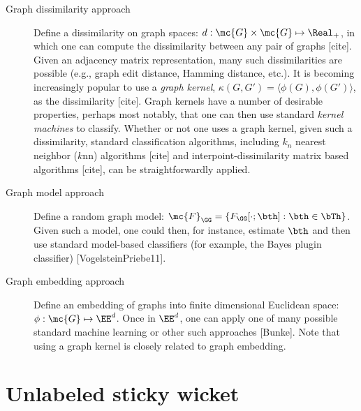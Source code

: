 \begin{description}
	\item[Graph dissimilarity approach] Define a dissimilarity on graph spaces: $d: \mc{G} \times \mc{G} \mapsto \Real_+$, in which one can compute the dissimilarity between any pair of graphs [cite]. Given an adjacency matrix representation, many such dissimilarities are possible (e.g., graph edit distance, Hamming distance, etc.).  It is becoming increasingly popular to use a \emph{graph kernel}, $\kappa(G,G')=\langle \phi(G), \phi(G') \rangle$, as the dissimilarity [cite].  Graph kernels have a number of desirable properties, perhaps most notably, that one can then use standard \emph{kernel machines} to classify.	Whether or not one uses a graph kernel, given such a dissimilarity, standard classification algorithms, including $k_n$ nearest neighbor ($k$nn) algorithms [cite] and interpoint-dissimilarity matrix based algorithms [cite], can be straightforwardly applied.  
	\item[Graph model approach] Define a random graph model: $\mc{F}_{\GG} = \{F_{\GG}[\cdot; \bth] : \bth \in \bTh\}$.  Given such a model, one could then, for instance, estimate $\bth$ and then use standard model-based classifiers (for example, the Bayes plugin classifier) [VogelsteinPriebe11]. 
	\item[Graph embedding approach] Define an embedding of graphs into finite dimensional Euclidean space: $\phi: \mc{G} \mapsto \EE^d$.  Once in $\EE^d$, one can apply one of many possible standard machine learning or other such approaches [Bunke]. Note that using a graph kernel is closely related to graph embedding.
\end{description}



\section{Unlabeled sticky wicket}


